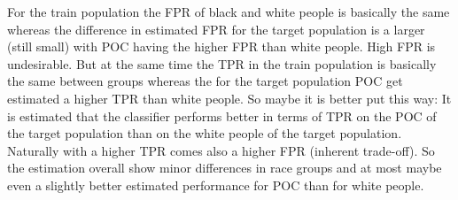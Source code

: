 For the train population the FPR of black and white people is basically the same whereas the difference in estimated FPR for the target population is a larger (still small) with POC having the higher FPR than white people. High FPR is undesirable.
But at the same time the TPR in the train population is basically the same between groups whereas the for the target population POC get estimated a higher TPR than white people.
So maybe it is better put this way: It is estimated that the classifier performs better in terms of TPR on the POC of the target population than on the white people of the target population. Naturally with a higher TPR comes also a higher FPR (inherent trade-off).
So the estimation overall show minor differences in race groups and at most maybe even a slightly better estimated performance for POC than for white people.



